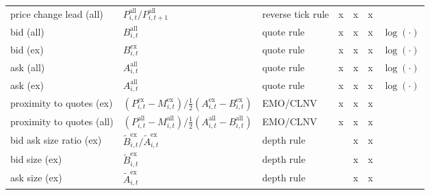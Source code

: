 \begin{threeparttable}
\begin{tabular}{@{}lllllll@{}}
        price change lead (all)   & $P_{i, t}^{\text{all}}/P_{i, t+1}^{\text{all}}$\tnote{*}                                                                             & reverse tick rule    & x    & x    & x    &               \\
        bid (all)                 & $B_{i, t}^{\text{all}}$                                                                                                              & quote rule           & x    & x    & x    & $\log(\cdot)$ \\
        bid (ex)                  & $B_{i, t}^{\text{ex}}$                                                                                                               & quote rule           & x    & x    & x    & $\log(\cdot)$ \\
        ask (all)                 & $A_{i, t}^{\text{all}}$                                                                                                              & quote rule           & x    & x    & x    & $\log(\cdot)$ \\
        ask (ex)                  & $A_{i, t}^{\text{all}}$                                                                                                              & quote rule           & x    & x    & x    & $\log(\cdot)$ \\
        proximity to quotes (ex)  & $\left(P_{i, t}^{\text{ex}}- M_{i, t}^{\text{ex}}\right) / \tfrac{1}{2} \left(A_{i, t}^{\text{ex}}- B_{i, t}^{\text{ex}}\right)$     & \gls{EMO}/\gls{CLNV} & x    & x    & x    &               \\
        proximity to quotes (all) & $\left(P_{i, t}^{\text{all}}- M_{i, t}^{\text{all}}\right) / \tfrac{1}{2} \left(A_{i, t}^{\text{all}}- B_{i, t}^{\text{all}}\right)$ & \gls{EMO}/\gls{CLNV} & x    & x    & x    &               \\
        bid ask size ratio (ex)   & $\tilde{B}_{i, t}^{\text{ex}}/\tilde{A}_{i, t}^{\text{ex}}$                                                                          & depth rule           &      & x    & x    &               \\
        bid size (ex)             & $\tilde{B}_{i, t}^{\text{ex}}$                                                                                                       & depth rule           &      & x    & x    &               \\
        ask size (ex)             & $\tilde{A}_{i, t}^{\text{ex}}$                                                                                                       & depth rule           &      & x    & x    &               \\

\end{tabular}
\end{threeparttable}
